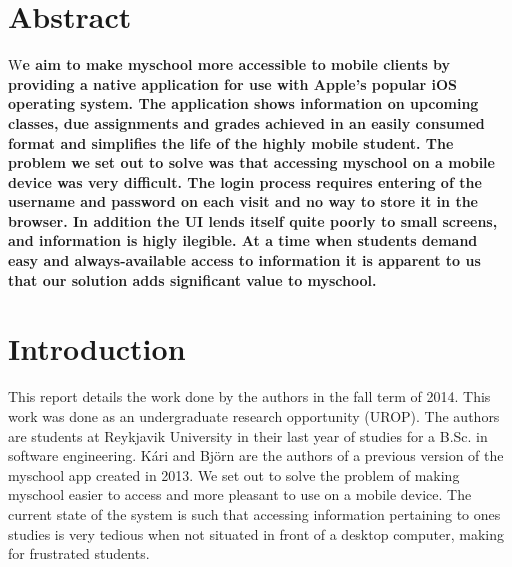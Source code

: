 \documentclass[pdftex, DIV=calc, paper=a4, fontsize=11pt, twocolumn]{scrartcl}	 %
\newcommand{\initial}[1]{ %
\lettrine[lines=3,lhang=0.3,nindent=0em]{
\color{DarkGray}
{\textsf{#1}}}{}}
\begin{document}


\thispagestyle{fancy} %

\section*{Abstract}
\initial{W}\textbf{e aim to make myschool more accessible to mobile clients by providing a native 
    application for use with Apple's popular iOS operating system. The application shows information
on upcoming classes, due assignments and grades achieved in an easily consumed format and simplifies
the life of the highly mobile student. The problem we set out to solve was that accessing myschool 
on a mobile device was very difficult. The login process requires entering of the username and 
password on each visit and no way to store it in the browser. In addition the UI lends itself quite
poorly to small screens, and information is higly ilegible. At a time when students demand easy
and always-available access to information it is apparent to us that our solution adds significant
value to myschool.}


\section*{Introduction}

This report details the work done by the authors in the fall term of 2014. This work was done
as an undergraduate research opportunity (UROP). The authors are students at Reykjavik University
in their last year of studies for a B.Sc. in software engineering. Kári and Björn are the authors
of a previous version of the myschool app created in 2013. We set out to solve the problem of 
making myschool easier to access and more pleasant to use on a mobile device. The current state
of the system is such that accessing information pertaining to ones studies is very tedious when not
situated in front of a desktop computer, making for frustrated students. 
\end{document}

